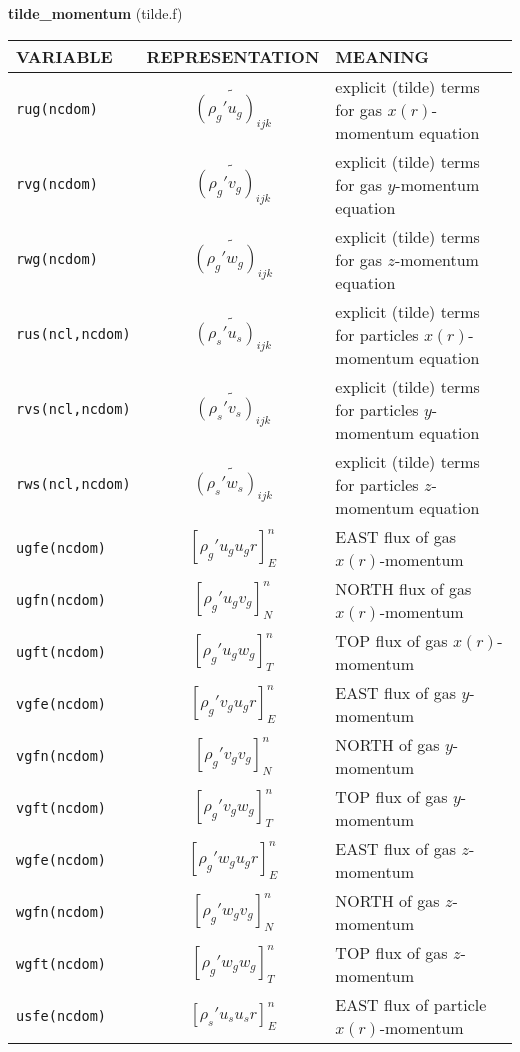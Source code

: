 %
%
{\large{\bf tilde\_momentum}} (tilde.f)\\[5mm]
\begin{tabular}{|p{4cm}|c|p{8cm}|}\hline
VARIABLE & REPRESENTATION & MEANING\\\hline
\tt rug(ncdom)& $\widetilde{(\rho_g'u_g)_{ijk}}$ &explicit (tilde) terms for gas $x(r)$-mo\-men\-tum equation\\\hline
\tt rvg(ncdom)& $\widetilde{(\rho_g'v_g)_{ijk}}$ &explicit (tilde) terms for gas $y$-mo\-men\-tum equation\\\hline
\tt rwg(ncdom)& $\widetilde{(\rho_g'w_g)_{ijk}}$ &explicit (tilde) terms for gas $z$-mo\-men\-tum equation\\\hline
\tt rus(ncl,ncdom)& $\widetilde{(\rho_s'u_s)_{ijk}}$ &explicit (tilde) terms for particles $x(r)$-mo\-men\-tum equation\\\hline
\tt rvs(ncl,ncdom)& $\widetilde{(\rho_s'v_s)_{ijk}}$ &explicit (tilde) terms for particles $y$-mo\-men\-tum equation\\\hline
\tt rws(ncl,ncdom)& $\widetilde{(\rho_s'w_s)_{ijk}}$ &explicit (tilde) terms for particles $z$-mo\-men\-tum equation\\\hline
\tt ugfe(ncdom) & $\left[ \rho_g' u_g u_g r \right]_{E}^n$ & EAST flux of gas $x(r)$-momentum \\\hline 
\tt ugfn(ncdom) & $\left[ \rho_g' u_g v_g \right]_{N}^n$ & NORTH flux of gas $x(r)$-momentum \\\hline
\tt ugft(ncdom) & $\left[ \rho_g' u_g w_g \right]_{T}^n$ & TOP flux of gas $x(r)$-momentum \\\hline
\tt vgfe(ncdom) & $\left[ \rho_g' v_g u_g r \right]_{E}^n$ & EAST flux of gas $y$-momentum \\\hline
\tt vgfn(ncdom) & $\left[ \rho_g' v_g v_g \right]_{N}^n$ & NORTH of gas $y$-momentum \\\hline
\tt vgft(ncdom) & $\left[ \rho_g' v_g w_g \right]_{T}^n$ & TOP flux of gas $y$-momentum \\\hline
\tt wgfe(ncdom) & $\left[ \rho_g' w_g u_g r \right]_{E}^n$ & EAST flux of gas $z$-momentum \\\hline
\tt wgfn(ncdom) & $\left[ \rho_g' w_g v_g \right]_{N}^n$ & NORTH of gas $z$-momentum \\\hline
\tt wgft(ncdom) & $\left[ \rho_g' w_g w_g \right]_{T}^n$ & TOP flux of gas $z$-momentum \\\hline
\tt usfe(ncdom) & $\left[ \rho_s' u_s u_s r \right]_{E}^n$ & EAST flux of particle $x(r)$-momentum \\\hline 

\end{tabular}
